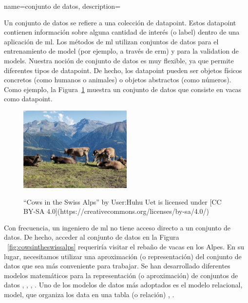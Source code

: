 {name={conjunto de datos},
	description={Un conjunto de datos se refiere a una colección de \gls{datapoint}. Estos 
		\gls{datapoint} contienen información sobre alguna cantidad de interés (o \gls{label}) dentro 
		de una aplicación de \gls{ml}. Los métodos de \gls{ml} utilizan conjuntos de datos para el entrenamiento de \gls{model} (por ejemplo, a través de \gls{erm})
		y para la \gls{validation} de \gls{model}s. Nuestra noción de conjunto de datos es muy flexible, 
		ya que permite diferentes tipos de \gls{datapoint}. De hecho, los \gls{datapoint} pueden ser objetos físicos concretos
		(como humanos o animales) o objetos abstractos (como números).
		Como ejemplo, la Figura\ \ref{fig_cows_dataset} muestra un conjunto de datos que consiste en vacas como 
		\gls{datapoint}. 
		\begin{figure}[H]
				\begin{center}
		\label{fig:cowsintheswissalps}
		\includegraphics[width=0.5\textwidth]{../../assets/Cows_in_the_Swiss_Alps}
		  \end{center}
		\caption{\label{fig_cows_dataset}“Cows in the Swiss Alps” by User:Huhu Uet is licensed under [CC BY-SA 4.0](https://creativecommons.org/licenses/by-sa/4.0/)}
	  \end{figure}
	   Con frecuencia, un ingeniero de \gls{ml}  no tiene acceso directo a un conjunto de datos. De hecho, acceder al conjunto de datos en la Figura 
       \ \ref{fig:cowsintheswissalps} requeriría visitar el rebaño de vacas en los Alpes. En su lugar, 
	   necesitamos utilizar una aproximación (o representación) del conjunto de datos que sea más conveniente para trabajar. 
       Se han desarrollado diferentes modelos matemáticos para la representación (o aproximación) de conjuntos de datos  
       \cite{silberschatz2019database}, \cite{abiteboul1995foundations}, \cite{hoberman2009data}, \cite{ramakrishnan2002database}. 
	   Uno de los modelos de datos más adoptados es el modelo relacional, \gls{model}, que organiza los \gls{data} 
       en una tabla (o relación) \cite{codd1970relational}, \cite{silberschatz2019database}.
}}
